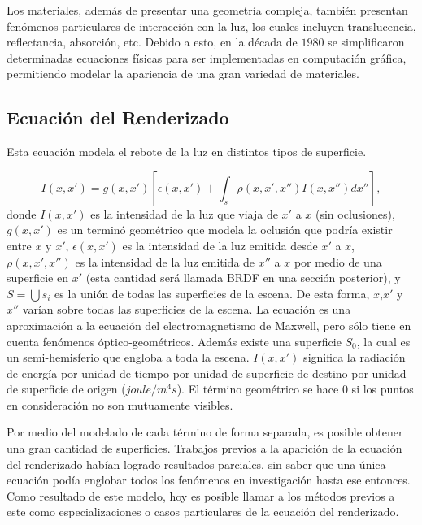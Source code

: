 Los materiales, además de presentar una geometría compleja, también presentan fenómenos particulares de interacción con la luz, los cuales incluyen translucencia, reflectancia, absorción, etc.
Debido a esto, en la década de $1980$ se simplificaron determinadas ecuaciones físicas para ser implementadas en computación gráfica, permitiendo modelar la apariencia de una gran variedad de materiales.

\subsection{Ecuación del Renderizado}

Esta ecuación modela el rebote de la luz en distintos tipos de superficie.

\begin{equation}
I(x,x') =  g(x,x')  \left[ \epsilon(x,x') + \int_{s}{\rho(x,x',x'')I(x,x'') dx''} \right],
\end{equation}
donde $I(x,x')$ es la intensidad de la luz que viaja de $x'$ a $x$ (sin oclusiones), $g(x,x')$ es un terminó geométrico que modela la oclusión que podría existir entre $x$ y $x'$, $\epsilon(x,x')$ es la intensidad de la luz emitida desde $x'$ a $x$, $\rho(x,x',x'')$ es la intensidad de la luz emitida de $x''$ a $x$ por medio de una superficie en $x'$ (esta cantidad será llamada BRDF en una sección posterior), y $S=\bigcup{s_{i}}$ es la unión de todas las superficies de la escena.
De esta forma, $x$,$x'$ y $x''$ varían sobre todas las superficies de la escena.
La ecuación es una aproximación a la ecuación del electromagnetismo de Maxwell, pero sólo tiene en cuenta fenómenos óptico-geométricos.
Además existe una superficie $S_{0}$, la cual es un semi-hemisferio que engloba a toda la escena.
$I(x,x')$ significa la radiación de energía por unidad de tiempo por unidad de superficie de destino por unidad de superficie de origen ($joule/m^{4} s$).
El término geométrico se hace $0$ si los puntos en consideración no son mutuamente visibles.

Por medio del modelado de cada término de forma separada, es posible obtener una gran cantidad de superficies.
Trabajos previos a la aparición de la ecuación del renderizado habían logrado resultados parciales, sin saber que una única ecuación podía englobar todos los fenómenos en investigación hasta ese entonces.
Como resultado de este modelo, hoy es posible llamar a los métodos previos a este como especializaciones o casos particulares de la ecuación del renderizado.

